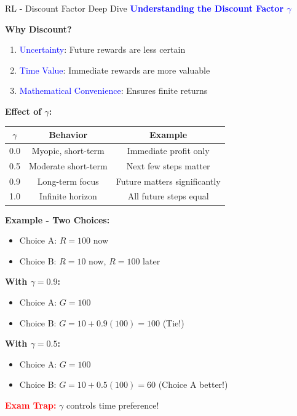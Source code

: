 \documentclass[8pt]{beamer}
\begin{document}
\begin{frame}{RL - Discount Factor Deep Dive}
\fontsize{6.5}{7.5}\selectfont
\textcolor{blue}{\textbf{Understanding the Discount Factor $\gamma$}}

\textbf{Why Discount?}
\begin{enumerate}
\item \textcolor{blue}{Uncertainty}: Future rewards are less certain
\item \textcolor{blue}{Time Value}: Immediate rewards are more valuable
\item \textcolor{blue}{Mathematical Convenience}: Ensures finite returns
\end{enumerate}

\textbf{Effect of $\gamma$:}
\begin{tabular}{|c|c|c|}
\hline
$\gamma$ & Behavior & Example \\
\hline
0.0 & Myopic, short-term & Immediate profit only \\
\hline
0.5 & Moderate short-term & Next few steps matter \\
\hline
0.9 & Long-term focus & Future matters significantly \\
\hline
1.0 & Infinite horizon & All future steps equal \\
\hline
\end{tabular}

\textbf{Example - Two Choices:}
\begin{itemize}
\item Choice A: $R = 100$ now
\item Choice B: $R = 10$ now, $R = 100$ later
\end{itemize}

\textbf{With $\gamma = 0.9$:}
\begin{itemize}
\item Choice A: $G = 100$
\item Choice B: $G = 10 + 0.9(100) = 100$ (Tie!)
\end{itemize}

\textbf{With $\gamma = 0.5$:}
\begin{itemize}
\item Choice A: $G = 100$
\item Choice B: $G = 10 + 0.5(100) = 60$ (Choice A better!)
\end{itemize}

\textcolor{red}{\textbf{Exam Trap:}} $\gamma$ controls time preference!
\end{frame}
\end{document}
